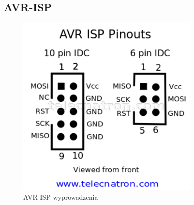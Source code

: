 \documentclass{article}
\begin{document}
\subsection{AVR-ISP}
\begin{figure}[H]
	\center
	\includegraphics[scale=0.9]{img/avr-isp-pinout.png}
	\caption{AVR-ISP wyprowadzenia}
	\label{fig:img8}
\end{figure}
\end{document}
